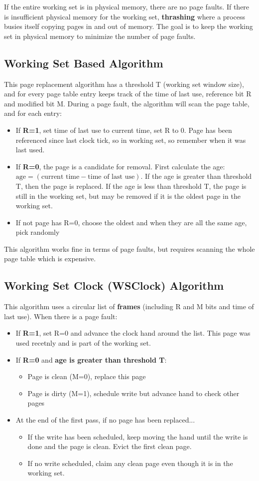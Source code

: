\documentclass{article}
\newcommand{\bold}[1]{\textbf{#1}}
\renewcommand{\b}{\item[$\circ$]}
\newcommand{\newlist}{\begin{itemize}}
\renewcommand{\endlist}{\end{itemize}}
\begin{document}
If the entire working set is in physical memory, there are no page faults. If there is insufficient physical memory for the working set, \bold{thrashing} where a process busies itself copying pages in and out of memory. The goal is to keep the working set in physical memory to minimize the number of page faults. 

\subsection{Working Set Based Algorithm}

This page replacement algorithm has a threshold T (working set window size), and for every page table entry keeps track of the time of last use, reference bit R and modified bit M. During a page fault, the algorithm will scan the page table, and for each entry: 

\newlist 
\b If \bold{R=1}, set time of last use to current time, set R to 0. Page has been referenced since last clock tick, so in working set, so remember when it was last used. 
\b If \bold{R=0}, the page is a candidate for removal. First calculate the age: $\textrm{age} = (\textrm{current time} - \textrm{time of last use})$. If the age is greater than threshold T, then the page is replaced. If the age is less than threshold T, the page is still in the working set, but may be removed if it is the oldest page in the working set. 
\b If not page has R=0, choose the oldest and when they are all the same age, pick randomly
\endlist

This algorithm works fine in terms of page faults, but requires scanning the whole page table which is expensive. 

\subsection{Working Set Clock (WSClock) Algorithm}

This algorithm uses a circular list of \bold{frames} (including R and M bits and time of last use). When there is a page fault: 

\newlist
\b If \bold{R=1}, set R=0 and advance the clock hand around the list. This page was used recetnly and is part of the working set. 
\b If \bold{R=0} and \bold{age is greater than threshold T}:
\newlist 
\b Page is clean (M=0), replace this page
\b Page is dirty (M=1), schedule write but advance hand to check other pages
\endlist
\b At the end of the first pass, if no page has been replaced...
\newlist
\b If the write has been scheduled, keep moving the hand until the write is done and the page is clean. Evict the first clean page. 
\b If no write scheduled, claim any clean page even though it is in the working set. 
\endlist
\endlist
\end{document}
